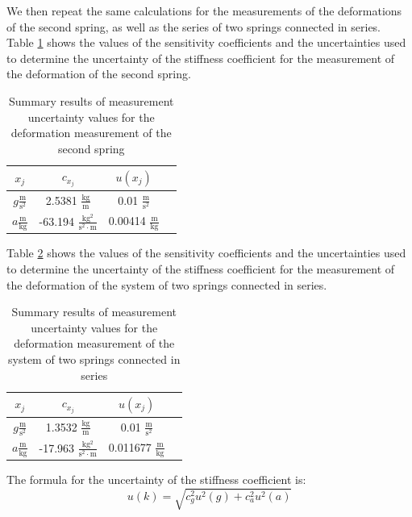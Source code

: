 \documentclass[a4paper,12pt,titlepage,bibliography=numbered]{article}
\begin{document}
\noindent We then repeat the same calculations for the measurements of the deformations of the second spring, as well as the series of two springs connected in series. \\ 
Table \ref{secound_spring_table_uncertainties} shows the values of the sensitivity coefficients and the uncertainties used to determine the uncertainty of the stiffness coefficient for the measurement of the deformation of the second spring. \\
\begin{table}[H]
\centering
\caption{Summary results of measurement uncertainty values for the deformation measurement of the second spring}\label{secound_spring_table_uncertainties}
\begin{tabular}{|c|c|c|c|}
\hline
\textbf{\(x_j\)} & \textbf{\(c_{x_j}\)} & \textbf{\(u(x_j)\)} \\ \hline
\(g \mathrm{\frac{m}{s^2}}\) & 2.5381 \(\mathrm{\frac{kg}{m}}\) & 0.01 \(\mathrm{\frac{m}{s^2}}\) \\ \hline
\(a \mathrm{\frac{m}{kg}}\) & -63.194 \(\mathrm{\frac{kg^2}{s^2 \cdot m}}\) & 0.00414 \(\mathrm{\frac{m}{kg}}\) \\ \hline
\end{tabular}
\end{table}
\noindent Table \ref{system_spring_table_uncertainties} shows the values of the sensitivity coefficients and the uncertainties used to determine the uncertainty of the stiffness coefficient for the measurement of the deformation of the system of two springs connected in series.
\begin{table}[H]
\centering
\caption{Summary results of measurement uncertainty values for the deformation measurement of the system of two springs connected in series} \label{system_spring_table_uncertainties}
\begin{tabular}{|c|c|c|c|}
\hline
\textbf{\(x_j\)} & \textbf{\(c_{x_j}\)} & \textbf{\(u(x_j)\)} \\ \hline
\(g \mathrm{\frac{m}{s^2}}\) & 1.3532 \(\mathrm{\frac{kg}{m}}\) & 0.01 \(\mathrm{\frac{m}{s^2}}\) \\ \hline
\(a \mathrm{\frac{m}{kg}}\) & -17.963 \(\mathrm{\frac{kg^2}{s^2 \cdot m}}\) & 0.011677 \(\mathrm{\frac{m}{kg}}\) \\ \hline
\end{tabular}
\end{table}
\noindent The formula for the uncertainty of the stiffness coefficient is:
\begin{equation}
    u(k) = \sqrt{c_g^2u^2(g) + c_a^2u^2(a)}
    \label{u(k)_eq}
\end{equation}
\end{document}
